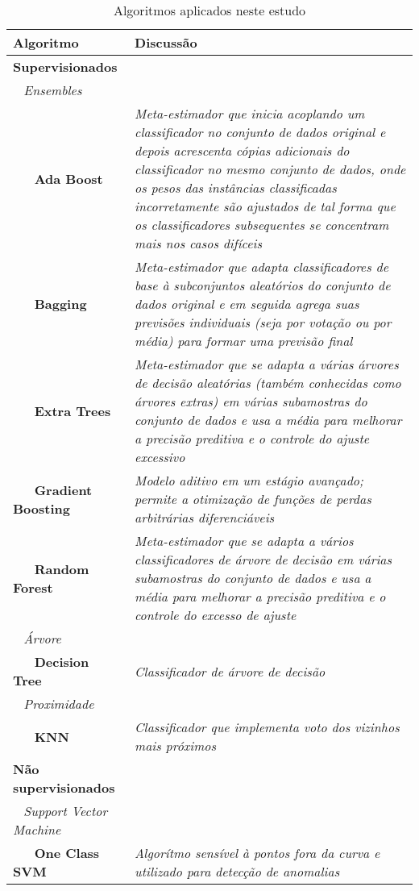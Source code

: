 \documentclass[twoside]{article}
\begin{document}
\begin{table}\scriptsize
    \centering
    \begin{tabular}{l >{\raggedright\arraybackslash}p{120mm}}
        \toprule
            Algoritmo &  Discussão \\
        \midrule
        \textbf{Supervisionados} \\
        ~ \textit{Ensembles} \\
        ~ ~ \textbf{Ada Boost} & \textit{Meta-estimador que inicia acoplando um classificador no conjunto de dados original e depois acrescenta cópias adicionais do classificador no mesmo conjunto de dados, onde os pesos das instâncias classificadas incorretamente são ajustados de tal forma que os classificadores subsequentes se concentram mais nos casos difíceis} \\
        ~ ~ \textbf{Bagging} & \textit{Meta-estimador que adapta classificadores de base à subconjuntos aleatórios do conjunto de dados original e em seguida agrega suas previsões individuais (seja por votação ou por média) para formar uma previsão final} \\
        ~ ~ \textbf{Extra Trees} & \textit{Meta-estimador que se adapta a várias árvores de decisão aleatórias (também conhecidas como árvores extras) em várias subamostras do conjunto de dados e usa a média para melhorar a precisão preditiva e o controle do ajuste excessivo} \\
        ~ ~ \textbf{Gradient Boosting} & \textit{Modelo aditivo em um estágio avançado; permite a otimização de funções de perdas arbitrárias diferenciáveis} \\
        ~ ~ \textbf{Random Forest} & \textit{Meta-estimador que se adapta a vários classificadores de árvore de decisão em várias subamostras do conjunto de dados e usa a média para melhorar a precisão preditiva e o controle do excesso de ajuste} \\
        \hline
        ~ \textit{Árvore} \\
        ~ ~ \textbf{Decision Tree} & \textit{Classificador de árvore de decisão} \\
        \hline
        ~ \textit{Proximidade} \\
        ~ ~ \textbf{KNN} & \textit{Classificador que implementa voto dos vizinhos mais próximos} \\
        \bottomrule
        \textbf{Não supervisionados} \\
        ~ \textit{Support Vector Machine} \\
        ~ ~ \textbf{One Class SVM} & \textit{Algorítmo sensível à pontos fora da curva e utilizado para detecção de anomalias} \\
        \bottomrule
        \end{tabular}
    \caption{Algoritmos aplicados neste estudo}
    \label{tab:alg}
\normalsize\end{table}
\end{document}
